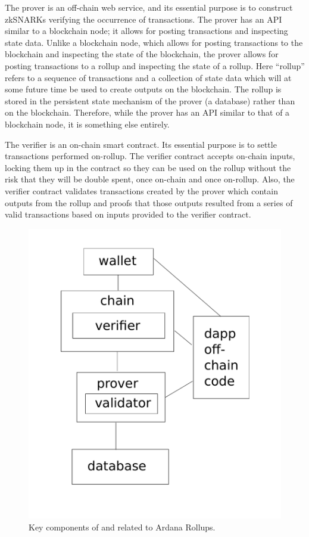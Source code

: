 \documentclass[12pt]{article}
\begin{document}
The prover is an off-chain web service, and its essential purpose is to construct zkSNARKs verifying the occurrence of transactions. The prover has an API similar to a blockchain node; it allows for posting transactions and inspecting state data. Unlike a blockchain node, which allows for posting transactions to the blockchain and inspecting the state of the blockchain, the prover allows for posting transactions to a rollup and inspecting the state of a rollup. Here ``rollup'' refers to a sequence of transactions and a collection of state data which will at some future time be used to create outputs on the blockchain. The rollup is stored in the persistent state mechanism of the prover (a database) rather than on the blockchain. Therefore, while the prover has an API similar to that of a blockchain node, it is something else entirely.

The verifier is an on-chain smart contract. Its essential purpose is to settle transactions performed on-rollup. The verifier contract accepts on-chain inputs, locking them up in the contract so they can be used on the rollup without the risk that they will be double spent, once on-chain and once on-rollup. Also, the verifier contract validates transactions created by the prover which contain outputs from the rollup and proofs that those outputs resulted from a series of valid transactions based on inputs provided to the verifier contract.

\begin{figure}
	\includegraphics[width=1.0\columnwidth]{system-diagram.pdf}
	\caption{Key components of and related to Ardana Rollups.}
	\label{fig:system-diagram}
\end{figure}
\end{document}
